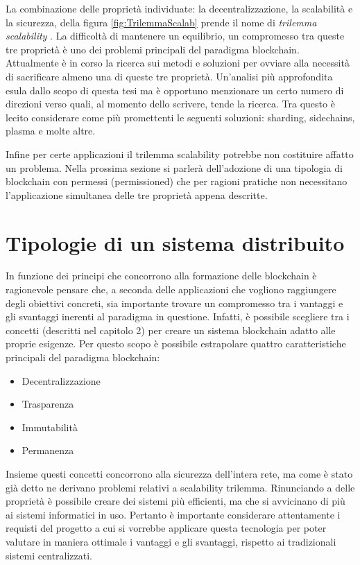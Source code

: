 La combinazione delle proprietà individuate: la decentralizzazione, la scalabilità e la sicurezza,  della figura \ref{fig:TrilemmaScalab} prende il nome di \emph{trilemma scalability} . La difficoltà di mantenere un equilibrio, un compromesso tra queste tre proprietà è uno dei problemi principali del paradigma blockchain. Attualmente è in corso la ricerca sui metodi e soluzioni per ovviare alla necessità di sacrificare almeno una di queste tre proprietà. Un’analisi più approfondita esula dallo scopo di questa tesi ma è opportuno menzionare un certo numero di direzioni verso quali, al momento dello scrivere, tende la ricerca. Tra questo è lecito considerare come più promettenti le seguenti soluzioni: sharding, sidechains, plasma e molte altre.

Infine per certe applicazioni il trilemma scalability potrebbe non costituire affatto un problema. Nella prossima sezione si parlerà dell’adozione di una tipologia di blockchain con permessi (permissioned) che per ragioni pratiche non necessitano l’applicazione simultanea delle tre proprietà appena descritte.

\section{Tipologie di un sistema distribuito} %

In funzione dei principi che concorrono alla formazione delle blockchain è ragionevole pensare che, a seconda delle applicazioni che vogliono raggiungere degli obiettivi concreti, sia importante trovare un compromesso tra i vantaggi e gli svantaggi inerenti al paradigma in questione. Infatti, è possibile scegliere tra i concetti (descritti nel capitolo 2) per creare un sistema blockchain adatto alle proprie esigenze. Per questo scopo è possibile estrapolare quattro caratteristiche principali del paradigma blockchain: 

\begin{itemize}
\item Decentralizzazione
\item Trasparenza
\item Immutabilità
\item Permanenza
\end{itemize}

Insieme questi concetti concorrono alla sicurezza dell'intera rete, ma come è stato già detto ne derivano problemi relativi a scalability trilemma. Rinunciando a delle proprietà è possibile creare dei sistemi più efficienti, ma che si avvicinano di più ai sistemi informatici in uso. Pertanto è importante considerare attentamente i requisti del progetto a cui si vorrebbe applicare questa tecnologia per poter valutare in maniera ottimale i vantaggi e gli svantaggi, rispetto ai tradizionali sistemi centralizzati.

